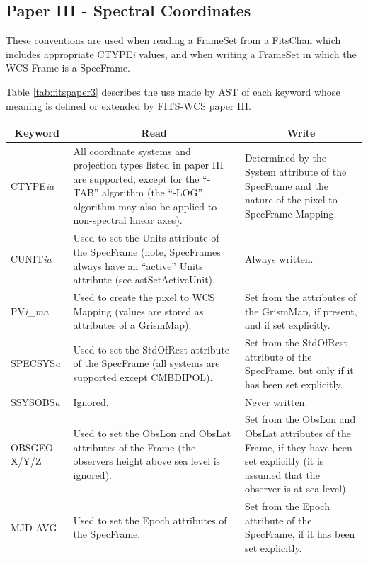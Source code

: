 \documentclass[twoside,11pt]{article}
\newcommand{\fitskey}[3]{{#1}&{#2}&{#3}\\}
\begin{document}
\subsection{Paper III - Spectral Coordinates}
These conventions are used when reading a FrameSet 
from a FitsChan which includes appropriate 
CTYPE\emph{i} values, and when writing a FrameSet in which
the WCS Frame is a SpecFrame.

Table \ref{tab:fitspaper3} describes the use made by AST of each keyword
whose meaning is defined or extended by FITS-WCS paper III. 

\begin{table}[htbp]
\begin{tabular}{|l|p{2.5in}|p{2.5in}|}
\hline
\multicolumn{1}{|c|}{{\bf Keyword}} & \multicolumn{1}{c|}{{\bf Read}} 
& \multicolumn{1}{c|}{{\bf Write}} \\ \hline

\fitskey{CTYPE\emph{ia}}{All coordinate systems and projection types
listed in paper III are supported, except for the ``-TAB''
algorithm (the ``-LOG'' algorithm may also be applied to non-spectral linear 
axes).}{Determined by the System attribute of the 
SpecFrame and the nature of the pixel to SpecFrame
Mapping.}

\fitskey{CUNIT\emph{ia}}{Used to set the Units attribute of 
the SpecFrame (note, SpecFrames always have an ``active'' Units attribute
(see astSetActiveUnit).}{Always written.}

\fitskey{PV\emph{i\_ma}}{Used to create the pixel to WCS Mapping (values
are stored as attributes of a GrismMap).}
{Set from the attributes of the GrismMap, if present, and if set explicitly.}

\fitskey{SPECSYS\emph{a}}{Used to set the StdOfRest
attribute of the SpecFrame (all systems are supported except CMBDIPOL).}
{Set from the StdOfRest attribute of the SpecFrame, but only if it has been 
set explicitly.}

\fitskey{SSYSOBS\emph{a}}{Ignored.}{Never written.}

\fitskey{OBSGEO-X/Y/Z}{Used to set the ObsLon and
ObsLat attributes of the Frame (the observers
height above sea level is ignored).}{Set from the ObsLon and ObsLat 
attributes of the Frame, if they have been set explicitly (it is
assumed that the observer is at sea level).}

\fitskey{MJD-AVG}{Used to set the Epoch attributes of
the SpecFrame.}{Set from the Epoch attribute of the SpecFrame, if it has
been set explicitly.}


\end{tabular}
\end{table}
\end{document}
